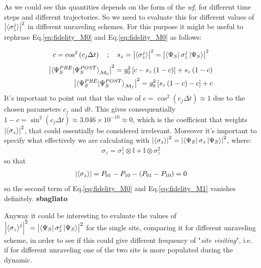 \documentclass[a4paper,12pt]{article}
\begin{document}
As we could see this quantities depends on the form of the \textit{wf}, for different time steps and different trajectories.
So we need to evaluate this for different values of $ \left| \braket{\sigma_{z}^{j}} \right|^2 $ in different unraveling schemes. For this purpose it might be useful to rephrase Eq.\eqref{eq:fidelity_M0} and Eq.\eqref{eq:fidelity_M0} as follows:

\begin{equation}
	c = \cos^{2} \left( c_{j} \Delta t \right) \quad ; \quad s_{z} = \left| \braket{\sigma_{z}^{j}} \right|^2 = \left| \bra{\Psi_{S}} \sigma_{z}^{j}\ket{\Psi_{S}} \right|^2
\end{equation}
\begin{align}
	\left| \braket{\Psi_{S}^{PRE} | \Psi_{S}^{POST}}_{\mathcal{M}_{0}} \right|^2 = g_{0}^{2} \left[ c - s_{z} \left(1 - c \right) \right] + s_{z} \left(1 - c \right) \label{eq:fidelity_M0_ref} \\
	\left| \braket{\Psi_{S}^{PRE} | \Psi_{S}^{POST}}_{\mathcal{M}_{1}} \right|^2 = g_{0}^{2} \left[ s_{z} \left(1 - c \right) - c \right] + c \label{eq:fidelity_M1_ref}
\end{align}
It's important to point out that the value of $ c = \cos^{2} \left( c_{j} \Delta t \right) \approx 1 $ due to the chosen parameters $ c_j $ and $ dt $. This gives consequentially $ 1 - c = \sin^{2} \left( c_{j} \Delta t \right) \approx 3.046 \times 10^{-10} \approx 0 $, which is the coefficient that weights $ \left| \braket{\sigma_{z}} \right|^2 $, that could essentially be considered irrelevant.
Moreover it's important to specify what effectively we are calculating with $ \left| \braket{\sigma_{z}} \right|^2 = \left| \bra{\Psi_{S}} \sigma_{z} \ket{\Psi_{S}} \right|^2 $, where:
\begin{gather}
	\sigma_{z} = \sigma_{z}^{1} \otimes \mathbb{I} + \mathbb{I} \otimes \sigma_{z}^{2}
\end{gather}
so that
\begin{align}
	\left| \braket{\sigma_{z}} \right| = P_{01} - P_{10} - \left( P_{01} - P_{10} \right) = 0
\end{align}
so the second term of Eq.\ref{eq:fidelity_M0} and Eq.\ref{eq:fidelity_M1} vanishes definitely. \textbf{sbagliato}

Anyway it could be interesting to evaluate the values of $ \left| \braket{\sigma_{z}}^{j} \right|^2 = \left| \bra{\Psi_{S}} \sigma_{z}^{j} \ket{\Psi_{S}} \right|^2 $ for the single site, comparing it for different unraveling scheme, in order to see if this could give different frequency of "\textit{site visiting}", i.e. if for different unraveling one of the two site is more populated during the dynamic.
\end{document}

